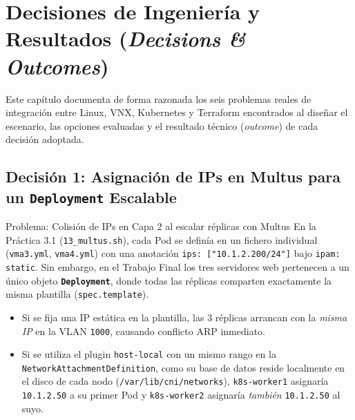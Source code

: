 \chapter{Decisiones de Ingeniería y Resultados (\textit{Decisions \& Outcomes})}

Este capítulo documenta de forma razonada los seis problemas reales de integración entre Linux, VNX, Kubernetes y Terraform encontrados al diseñar el escenario, las opciones evaluadas y el resultado técnico (\textit{outcome}) de cada decisión adoptada.

\section{Decisión 1: Asignación de IPs en Multus para un \texttt{Deployment} Escalable}

\begin{decisionbox}{Problema: Colisión de IPs en Capa 2 al escalar réplicas con Multus}
En la Práctica 3.1 (\texttt{13\_multus.sh}), cada Pod se definía en un fichero individual (\texttt{vma3.yml}, \texttt{vma4.yml}) con una anotación \texttt{ips: ["10.1.2.200/24"]} bajo \texttt{ipam: static}. Sin embargo, en el Trabajo Final los tres servidores web pertenecen a un único objeto \textbf{\texttt{Deployment}}, donde todas las réplicas comparten exactamente la misma plantilla (\texttt{spec.template}).
\begin{itemize}
  \item Si se fija una IP estática en la plantilla, las 3 réplicas arrancan con la \emph{misma IP} en la VLAN \texttt{1000}, causando conflicto ARP inmediato.
  \item Si se utiliza el plugin \texttt{host-local} con un mismo rango en la \texttt{NetworkAttachmentDefinition}, como su base de datos reside localmente en el disco de cada nodo (\texttt{/var/lib/cni/networks}), \texttt{k8s-worker1} asignaría \texttt{10.1.2.50} a su primer Pod y \texttt{k8s-worker2} asignaría \emph{también} \texttt{10.1.2.50} al suyo.
\end{itemize}
\end{decisionbox}

